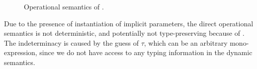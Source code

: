 \begin{figure}[t]
    \centering


    \caption{Operational semantics of \name.}
    \label{fig:semantics}
\end{figure}

Due to the presence of instantiation of implicit parameters, the direct operational
semantics is not deterministic, and potentially not type-preserving because of
. The indeterminacy is caused by the guess of $\tau$,
which can be an arbitrary mono-expression, since we do not have access to any typing
information in the dynamic semantics.


